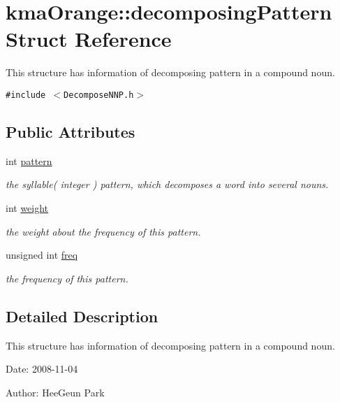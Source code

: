 \hypertarget{structkmaOrange_1_1decomposingPattern}{
\section{kmaOrange::decomposingPattern Struct Reference}
\label{structkmaOrange_1_1decomposingPattern}
}
This structure has information of decomposing pattern in a compound noun.  


{\tt \#include $<$DecomposeNNP.h$>$}

\subsection*{Public Attributes}
\begin{CompactItemize}
\item 
int \hyperlink{structkmaOrange_1_1decomposingPattern_ecc5c9a58e3605a00a1c4d44b52fdeb6}{pattern}
\begin{CompactList}\small\item\em the syllable( integer ) pattern, which decomposes a word into several nouns. \item\end{CompactList}\item 
int \hyperlink{structkmaOrange_1_1decomposingPattern_f5dd3d946ab260f3f457f9366d5ce1ec}{weight}
\begin{CompactList}\small\item\em the weight about the frequency of this pattern. \item\end{CompactList}\item 
unsigned int \hyperlink{structkmaOrange_1_1decomposingPattern_ff7d9c9fbf02ebaebd7a38b77d711ac6}{freq}
\begin{CompactList}\small\item\em the frequency of this pattern. \item\end{CompactList}\end{CompactItemize}


\subsection{Detailed Description}
This structure has information of decomposing pattern in a compound noun. 

\begin{Desc}
\item[Date:]2008-11-04 \end{Desc}
\begin{Desc}
\item[Author:]HeeGeun Park \end{Desc}


